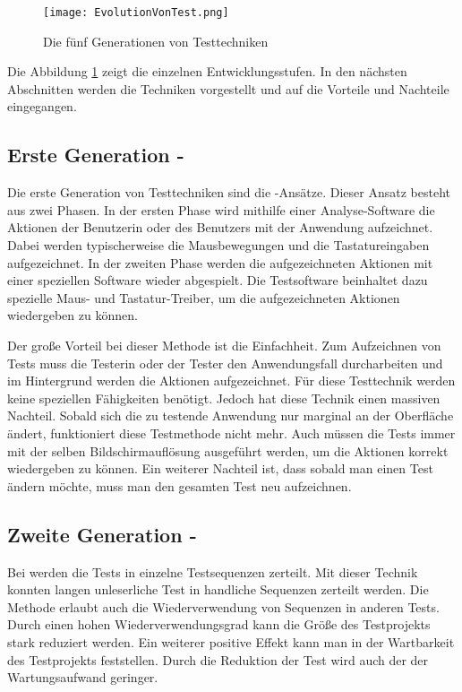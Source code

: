 \begin{figure}
\centering
\texttt{[image: EvolutionVonTest.png]}
\caption{Die fünf Generationen von Testtechniken}
\label{fig:testEvolution}
\end{figure}

\SuperPar
Die Abbildung \ref{fig:testEvolution} zeigt die einzelnen Entwicklungsstufen. In den nächsten Abschnitten werden die Techniken vorgestellt und auf die Vorteile und Nachteile eingegangen.

\subsection{Erste Generation - }

Die erste Generation von Testtechniken sind die -Ansätze. Dieser Ansatz besteht aus zwei Phasen. In der ersten Phase wird mithilfe einer Analyse-Software die Aktionen der Benutzerin oder des Benutzers mit der Anwendung aufzeichnet. Dabei werden typischerweise die Mausbewegungen und die Tastatureingaben aufgezeichnet. In der zweiten Phase werden die aufgezeichneten Aktionen mit einer speziellen Software wieder abgespielt. Die Testsoftware beinhaltet dazu spezielle Maus- und Tastatur-Treiber, um die aufgezeichneten Aktionen wiedergeben zu können.

\SuperPar
Der große Vorteil bei dieser Methode ist die Einfachheit. Zum Aufzeichnen von Tests muss die Testerin oder der Tester den Anwendungsfall durcharbeiten und im Hintergrund werden die Aktionen aufgezeichnet. Für diese Testtechnik werden keine speziellen Fähigkeiten benötigt. Jedoch hat diese Technik einen massiven Nachteil. Sobald sich die zu testende Anwendung nur marginal an der Oberfläche ändert, funktioniert diese Testmethode nicht mehr. Auch müssen die Tests immer mit der selben Bildschirmauflösung ausgeführt werden, um die Aktionen korrekt wiedergeben zu können. Ein weiterer Nachteil ist, dass sobald man einen Test ändern möchte, muss man den gesamten Test neu aufzeichnen.

\subsection{Zweite Generation - }

Bei  werden die Tests in einzelne Testsequenzen zerteilt. Mit dieser Technik konnten langen unleserliche Test in handliche Sequenzen zerteilt werden. Die Methode erlaubt auch die Wiederverwendung von Sequenzen in anderen Tests. Durch einen hohen Wiederverwendungsgrad kann die Größe des Testprojekts stark reduziert werden. Ein weiterer positive Effekt kann man in der Wartbarkeit des Testprojekts feststellen. Durch die Reduktion der Test wird auch der der Wartungsaufwand geringer.

